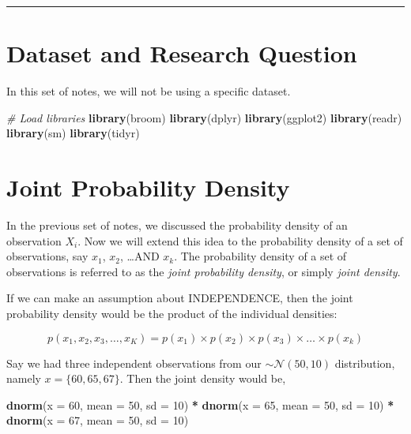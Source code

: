 \documentclass[]{book}
\newenvironment{Shaded}{\begin{snugshade}}{\end{snugshade}}
\newcommand{\CommentTok}[1]{\textcolor[rgb]{0.56,0.35,0.01}{\textit{#1}}}
\newcommand{\DataTypeTok}[1]{\textcolor[rgb]{0.13,0.29,0.53}{#1}}
\newcommand{\DecValTok}[1]{\textcolor[rgb]{0.00,0.00,0.81}{#1}}
\newcommand{\KeywordTok}[1]{\textcolor[rgb]{0.13,0.29,0.53}{\textbf{#1}}}
\newcommand{\NormalTok}[1]{#1}
\newcommand{\OperatorTok}[1]{\textcolor[rgb]{0.81,0.36,0.00}{\textbf{#1}}}
\newcommand{\StringTok}[1]{\textcolor[rgb]{0.31,0.60,0.02}{#1}}
\begin{document}
\begin{center}\rule{0.5\linewidth}{\linethickness}\end{center}

\hypertarget{dataset-and-research-question-3}{%
\section{Dataset and Research Question}\label{dataset-and-research-question-3}}

In this set of notes, we will not be using a specific dataset.

\begin{Shaded}
\begin{Highlighting}[]
\CommentTok{# Load libraries}
\KeywordTok{library}\NormalTok{(broom)}
\KeywordTok{library}\NormalTok{(dplyr)}
\KeywordTok{library}\NormalTok{(ggplot2)}
\KeywordTok{library}\NormalTok{(readr)}
\KeywordTok{library}\NormalTok{(sm)}
\KeywordTok{library}\NormalTok{(tidyr)}
\end{Highlighting}
\end{Shaded}

\hypertarget{joint-probability-density}{%
\section{Joint Probability Density}\label{joint-probability-density}}

In the previous set of notes, we discussed the probability density of an observation \(X_i\). Now we will extend this idea to the probability density of a set of observations, say \(x_1\), \(x_2\), \ldots AND \(x_k\). The probability density of a set of observations is referred to as the \emph{joint probability density}, or simply \emph{joint density}.

If we can make an assumption about INDEPENDENCE, then the joint probability density would be the product of the individual densities:

\[
p(x_1, x_2, x_3, \ldots, x_K) = p(x_1) \times p(x_2) \times p(x_3) \times \ldots \times p(x_k)
\]

Say we had three independent observations from our \(\sim\mathcal{N}(50,10)\) distribution, namely \(x =\{60, 65, 67\}\). Then the joint density would be,

\begin{Shaded}
\begin{Highlighting}[]
\KeywordTok{dnorm}\NormalTok{(}\DataTypeTok{x =} \DecValTok{60}\NormalTok{, }\DataTypeTok{mean =} \DecValTok{50}\NormalTok{, }\DataTypeTok{sd =} \DecValTok{10}\NormalTok{) }\OperatorTok{*}\StringTok{ }\KeywordTok{dnorm}\NormalTok{(}\DataTypeTok{x =} \DecValTok{65}\NormalTok{, }\DataTypeTok{mean =} \DecValTok{50}\NormalTok{, }\DataTypeTok{sd =} \DecValTok{10}\NormalTok{) }\OperatorTok{*}\StringTok{ }\KeywordTok{dnorm}\NormalTok{(}\DataTypeTok{x =} \DecValTok{67}\NormalTok{, }\DataTypeTok{mean =} \DecValTok{50}\NormalTok{, }\DataTypeTok{sd =} \DecValTok{10}\NormalTok{)}
\end{Highlighting}
\end{Shaded}
\end{document}
